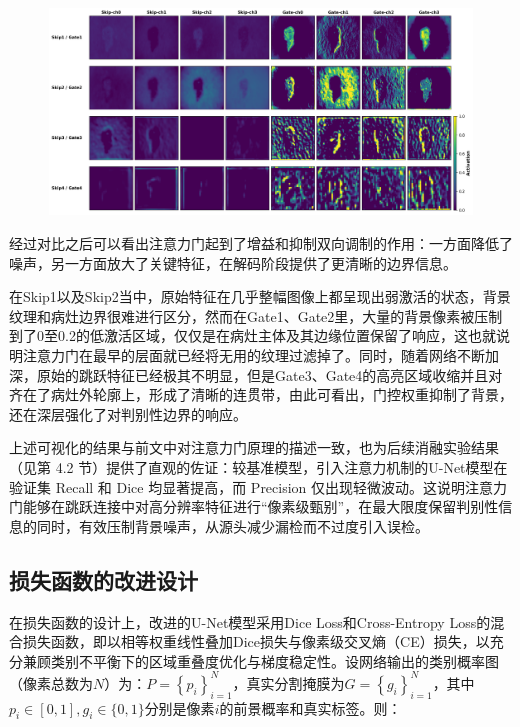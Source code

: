 \begin{figure}[!htbp]
    \centering
    \includegraphics[width=\textwidth]{fig/unet_vs_attunet_feature_compare.png}
    \caption{}
    \label{fig:skip_vs_gate_vis}
\end{figure}

经过对比之后可以看出注意力门起到了增益和抑制双向调制的作用：一方面降低了噪声，另一方面放大了关键特征，在解码阶段提供了更清晰的边界信息。

在Skip1以及Skip2当中，原始特征在几乎整幅图像上都呈现出弱激活的状态，背景纹理和病灶边界很难进行区分，然而在Gate1、Gate2里，大量的背景像素被压制到了0至0.2的低激活区域，仅仅是在病灶主体及其边缘位置保留了响应，这也就说明注意力门在最早的层面就已经将无用的纹理过滤掉了。同时，随着网络不断加深，原始的跳跃特征已经极其不明显，但是Gate3、Gate4的高亮区域收缩并且对齐在了病灶外轮廓上，形成了清晰的连贯带，由此可看出，门控权重抑制了背景，还在深层强化了对判别性边界的响应。

上述可视化的结果与前文中对注意力门原理的描述一致，也为后续消融实验结果（见第 4.2 节）提供了直观的佐证：较基准模型，引入注意力机制的U-Net模型在验证集 Recall 和 Dice 均显著提高，而 Precision 仅出现轻微波动。这说明注意力门能够在跳跃连接中对高分辨率特征进行“像素级甄别”，在最大限度保留判别性信息的同时，有效压制背景噪声，从源头减少漏检而不过度引入误检。

\subsection{损失函数的改进设计}

在损失函数的设计上，改进的U-Net模型采用Dice Loss和Cross-Entropy Loss的混合损失函数，即以相等权重线性叠加Dice损失与像素级交叉熵（CE）损失，以充分兼顾类别不平衡下的区域重叠度优化与梯度稳定性。设网络输出的类别概率图（像素总数为$N$）为：$ P=\left\{p_{i}\right\}_{i=1}^{N} $，真实分割掩膜为$ G=\left\{g_{i}\right\}_{i=1}^{N} $，其中$ p_{i} \in[0,1], g_{i} \in\{0,1\}$分别是像素$i$的前景概率和真实标签。则：

